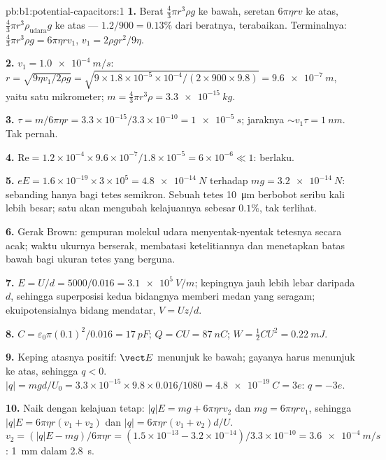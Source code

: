 \begin{solution}{pb:b1:potential-capacitors:1}
\textbf{1.} Berat $\tfrac43\pi r^3\rho g$ ke bawah, seretan $6\pi\eta rv$ ke atas,
 $\tfrac43\pi r^3\rho_{\text{udara}}g$ ke atas --- $1.2/900 = 0.13\%$ dari
beratnya, terabaikan. Terminalnya: $\tfrac43\pi r^3\rho g = 6\pi\eta rv_1$, $v_1 =
2\rho gr^2/9\eta$.

\textbf{2.} $v_1 = \qty{1.0e-4}{m/s}$: $r = \sqrt{9\eta v_1/2\rho g} = \sqrt{9 \times
1.8 \times 10^{-5} \times 10^{-4}/(2 \times 900 \times 9.8)} = \qty{9.6e-7}{m}$, yaitu satu
mikrometer; $m = \tfrac43\pi r^3\rho = \qty{3.3e-15}{kg}$.

\textbf{3.} $\tau = m/6\pi\eta r = 3.3 \times 10^{-15}/3.3 \times 10^{-10} = \qty{1e-5}{s}$;
jaraknya $\sim v_1\tau = \qty{1}{nm}$. Tak pernah.

\textbf{4.} $\mathrm{Re} = 1.2 \times 10^{-4} \times 9.6 \times 10^{-7}/1.8 \times 10^{-5} =
6 \times 10^{-6} \ll 1$:  berlaku.

\textbf{5.} $eE = 1.6 \times 10^{-19} \times 3 \times 10^5 = \qty{4.8e-14}{N}$ terhadap
$mg = \qty{3.2e-14}{N}$: sebanding hanya bagi tetes semikron. Sebuah tetes
\qty{10}{\micro m} berbobot seribu kali lebih besar; satu  akan mengubah
kelajuannya sebesar $0.1\%$, tak terlihat.

\textbf{6.} Gerak Brown: gempuran molekul udara menyentak-nyentak
tetesnya secara acak; waktu ukurnya berserak, membatasi ketelitiannya dan
menetapkan batas bawah bagi ukuran tetes yang berguna.

\textbf{7.} $E = U/d = 5000/0.016 = \qty{3.1e5}{V/m}$; kepingnya jauh lebih lebar daripada
$d$, sehingga superposisi kedua bidangnya memberi medan yang seragam;
ekuipotensialnya bidang mendatar, $V = Uz/d$.

\textbf{8.} $C = \varepsilon_0\pi(0.1)^2/0.016 = \qty{17}{pF}$; $Q = CU = \qty{87}{nC}$;
$W = \tfrac12CU^2 = \qty{0.22}{mJ}$.

\textbf{9.} Keping atasnya positif: $\vect E$ menunjuk ke bawah; gayanya harus
menunjuk ke atas, sehingga $q < 0$. $|q| = mgd/U_0 = 3.3 \times 10^{-15} \times 9.8 \times 0.016/
1080 = \qty{4.8e-19}{C} = 3e$: $q = -3e$.

\textbf{10.} Naik dengan kelajuan tetap: $|q|E = mg + 6\pi\eta rv_2$ dan $mg =
6\pi\eta rv_1$, sehingga $|q|E = 6\pi\eta r(v_1 + v_2)$ dan $|q| = 6\pi\eta r(v_1 +
v_2)d/U$. $v_2 = (|q|E - mg)/6\pi\eta r = (1.5 \times 10^{-13} - 3.2 \times 10^{-14})/
3.3 \times 10^{-10} = \qty{3.6e-4}{m/s}$: \qty{1}{mm} dalam \qty{2.8}{s}.


\end{solution}
